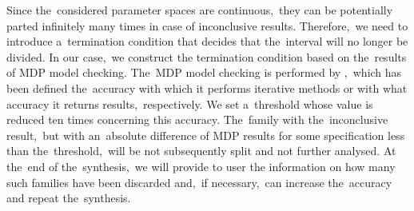 Since the~considered parameter spaces are continuous,~they can be potentially parted infinitely many times in case of inconclusive results.
Therefore,~we need to introduce a~termination condition that decides that the~interval will no longer be divided.
In our case,~we construct the termination condition based on the~results of MDP model checking.
The~MDP model checking is performed by \storm{},~which has been defined the~accuracy with which it performs iterative methods or with what accuracy it returns results,~respectively.
We set a~threshold whose value is reduced ten times concerning this accuracy.
The~family with the~inconclusive result,~but with an~absolute difference of MDP results for some specification less than the~threshold,~will be not subsequently split and not further analysed.
At the~end of the~synthesis,~we will provide to user the information on how many such families have been discarded and,~if necessary,~can increase the~accuracy and repeat the~synthesis.


